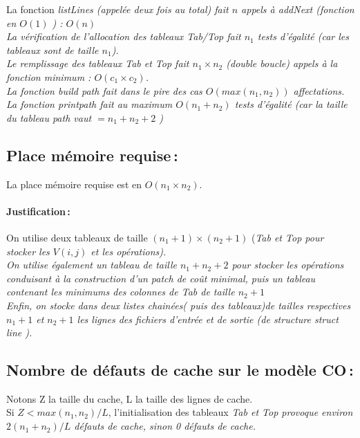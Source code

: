 \documentclass[a4paper, 10pt, french]{article}
\begin{document}
        La fonction \it listLines \rm (appelée deux fois au total) fait $n$ appels à \it addNext \rm (fonction en $O(1)$ ) : $O(n)$ \\
        La vérification de l'allocation des tableaux \it Tab/Top \rm fait $n_1$ tests d'égalité (car les tableaux sont de taille $n_1$). \\
        Le remplissage des tableaux \it Tab et Top fait $n_1\times n_2$ (double boucle) appels à la fonction \it minimum : $O(c_1 \times c_2)$.\\
        La fonction \it build path \rm fait dans le pire des cas $O(max(n_1,n_2))$ affectations. \\
        La fonction \it printpath \rm fait au maximum $O(n_1+n_2)$ tests d'égalité  (car la taille du tableau path vaut $= n_1+n_2+2$ ) \\
   
  \subsection{Place mémoire requise\,: }
  
  La place mémoire requise est en $O(n_1 \times n_2)$. 
    \paragraph{Justification\,:  }
    
    On utilise deux tableaux de taille $(n_1+1)\times (n_2+1)$ (\it Tab \rm et \it Top \rm pour stocker les $V(i,j)$ et les opérations). \\
    On utilise également un tableau de taille $n_1+n_2+2$ pour stocker les opérations conduisant à la construction d'un patch de coût minimal, puis un tableau contenant les minimums des colonnes de \it Tab \rm de taille $ n_2+1 $\\
    Enfin, on stocke dans deux listes chainées( puis des tableaux)de tailles respectives $n_1 +1$ et $n_2+1$ les lignes des fichiers d'entrée et de sortie (de structure \it struct line \rm ).

  \subsection{Nombre de défauts de cache sur le modèle CO\,: }
   
Notons Z la taille du cache, L la taille des lignes de cache.\\  
Si $Z<max(n_1,n_2)/L$, l'initialisation des tableaux \it Tab \rm et \it Top \rm provoque environ $2(n_1+n_2)/L$ défauts de cache, sinon 0 défauts de cache. \\
\end{document}
